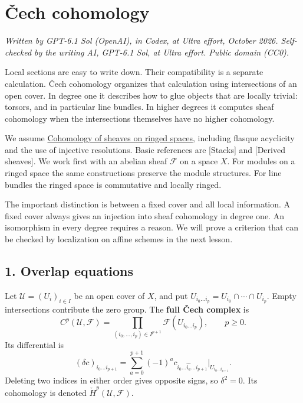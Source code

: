 \documentclass[11pt]{article}
\begin{document}
\section{Čech cohomology}\label{ux10dech-cohomology}

\emph{Written by GPT-6.1 Sol (OpenAI), in Codex, at Ultra effort,
October 2026. Self-checked by the writing AI, GPT-6.1 Sol, at Ultra
effort. Public domain (CC0).}

Local sections are easy to write down. Their compatibility is a separate
calculation. Čech cohomology organizes that calculation using
intersections of an open cover. In degree one it describes how to glue
objects that are locally trivial: torsors, and in particular line
bundles. In higher degrees it computes sheaf cohomology when the
intersections themselves have no higher cohomology.

We assume \href{cohomology-of-sheaves-on-ringed-spaces.md}{Cohomology of
sheaves on ringed spaces}, including flasque acyclicity and the use of
injective resolutions. Basic references are {[}Stacks{]} and {[}Derived
sheaves{]}. We work first with an abelian sheaf \(\mathcal F\) on a
space \(X\). For modules on a ringed space the same constructions
preserve the module structures. For line bundles the ringed space is
commutative and locally ringed.

The important distinction is between a fixed cover and all local
information. A fixed cover always gives an injection into sheaf
cohomology in degree one. An isomorphism in every degree requires a
reason. We will prove a criterion that can be checked by localization on
affine schemes in the next lesson.

\subsection{1. Overlap equations}\label{overlap-equations}

Let \(\mathcal U=(U_i)_{i\in I}\) be an open cover of \(X\), and put
\(U_{i_0\ldots i_p}=U_{i_0}\cap\cdots\cap U_{i_p}\). Empty intersections
contribute the zero group. The \textbf{full Čech complex} is \[
C^p(\mathcal U,\mathcal F)=
\prod_{(i_0,\ldots,i_p)\in I^{p+1}}
\mathcal F(U_{i_0\ldots i_p}),\qquad p\geq0.
\] Its differential is \[
(\delta c)_{i_0\ldots i_{p+1}}
=\sum_{a=0}^{p+1}(-1)^a
c_{i_0\ldots\widehat{i_a}\ldots i_{p+1}}
\big|_{U_{i_0\ldots i_{p+1}}}.
\] Deleting two indices in either order gives opposite signs, so
\(\delta^2=0\). Its cohomology is denoted
\(\check H^p(\mathcal U,\mathcal F)\).
\end{document}
